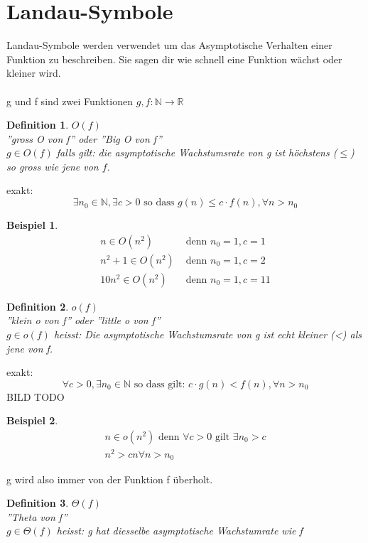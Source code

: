\documentclass[a4paper,10pt]{report}
\newtheorem{mydef}{Definition}
\newtheorem{myexample}{Beispiel}
\newcommand{\N}{{\mathbb N}}
\newcommand{\R}{{\mathbb R}}
\begin{document}
\section{Landau-Symbole}
Landau-Symbole werden verwendet um das Asymptotische Verhalten einer Funktion zu beschreiben. Sie sagen dir wie schnell eine Funktion wächst oder kleiner wird.
\\
\\
g und f sind zwei Funktionen $g, f : \N \to \R$
\begin{mydef}
	$O(f)$\\
	''gross O von f'' oder ''Big O von f''\\
	$g \in O(f)$ falls gilt: die asymptotische Wachstumsrate von g ist höchstens ($\leq$) so gross wie jene von $f$.
\end{mydef}
\noindent
exakt:
\begin{equation*}\exists n_0 \in \N, \exists c > 0 \text{ so dass }  g(n) \leq c \cdot f(n), \forall n > n_0
\end{equation*}
\begin{myexample}
\begin{eqnarray*}
	n\in O(n^2) &\text{ denn } n_0 = 1, c = 1\\
		n^2+1 \in O(n^2) &\text{ denn } n_0 = 1, c = 2\\
		10n^2 \in O(n^2) &\text{ denn } n_0 = 1, c = 11
	\end{eqnarray*}
\end{myexample}
\begin{mydef}
	$o(f)$ \\
	''klein o von f'' oder ''little o von f''\\
	$g \in o(f)$ heisst: Die asymptotische Wachstumsrate von g ist echt kleiner (<) als jene von f.
\end{mydef}
\noindent
exakt:
\begin{equation*}
	\forall c > 0, \exists n_0 \in \N \text{ so dass gilt: } c \cdot g(n) <  f(n), \forall n > n_0
\end{equation*}
BILD TODO
\begin{myexample}
	\begin{eqnarray*}
		n \in o(n^2) \text{ denn } \forall c > 0 \text{ gilt } \exists n_0 > c \\
		n^2 > cn \forall n > n_0
	\end{eqnarray*}
\end{myexample}
\noindent
g wird also immer von der Funktion f überholt.
\begin{mydef}
	$\Theta(f)$\\
	''Theta von f''\\
	$g \in \Theta(f)$ heisst: g hat diesselbe asymptotische Wachstumrate wie f
\end{mydef}
\end{document}
